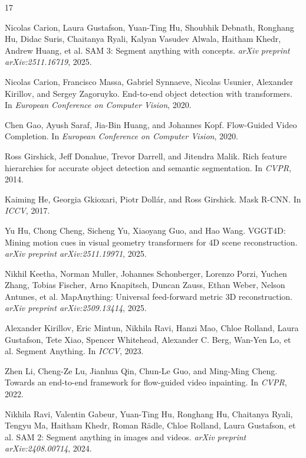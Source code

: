 \documentclass[10pt,twocolumn,letterpaper]{article}
\begin{document}
\begin{thebibliography}{17}\small

Nicolas Carion, Laura Gustafson, Yuan-Ting Hu, Shoubhik Debnath, Ronghang Hu, Didac Suris, Chaitanya Ryali, Kalyan Vasudev Alwala, Haitham Khedr, Andrew Huang, et al.
SAM 3: Segment anything with concepts.
\textit{arXiv preprint arXiv:2511.16719}, 2025.

Nicolas Carion, Francisco Massa, Gabriel Synnaeve, Nicolas Usunier, Alexander Kirillov, and Sergey Zagoruyko.
End-to-end object detection with transformers.
In \textit{European Conference on Computer Vision}, 2020.

Chen Gao, Ayush Saraf, Jia-Bin Huang, and Johannes Kopf.
Flow-Guided Video Completion.
In \textit{European Conference on Computer Vision}, 2020.

Ross Girshick, Jeff Donahue, Trevor Darrell, and Jitendra Malik.
Rich feature hierarchies for accurate object detection and semantic segmentation.
In \textit{CVPR}, 2014.

Kaiming He, Georgia Gkioxari, Piotr Doll{\'a}r, and Ross Girshick.
Mask R-CNN.
In \textit{ICCV}, 2017.

Yu Hu, Chong Cheng, Sicheng Yu, Xiaoyang Guo, and Hao Wang.
VGGT4D: Mining motion cues in visual geometry transformers for 4D scene reconstruction.
\textit{arXiv preprint arXiv:2511.19971}, 2025.

Nikhil Keetha, Norman Muller, Johannes Schonberger, Lorenzo Porzi, Yuchen Zhang, Tobias Fischer, Arno Knapitsch, Duncan Zauss, Ethan Weber, Nelson Antunes, et al.
MapAnything: Universal feed-forward metric 3D reconstruction.
\textit{arXiv preprint arXiv:2509.13414}, 2025.

Alexander Kirillov, Eric Mintun, Nikhila Ravi, Hanzi Mao, Chloe Rolland, Laura Gustafson, Tete Xiao, Spencer Whitehead, Alexander C. Berg, Wan-Yen Lo, et al.
Segment Anything.
In \textit{ICCV}, 2023.

Zhen Li, Cheng-Ze Lu, Jianhua Qin, Chun-Le Guo, and Ming-Ming Cheng.
Towards an end-to-end framework for flow-guided video inpainting.
In \textit{CVPR}, 2022.

Nikhila Ravi, Valentin Gabeur, Yuan-Ting Hu, Ronghang Hu, Chaitanya Ryali, Tengyu Ma, Haitham Khedr, Roman R\"adle, Chloe Rolland, Laura Gustafson, et al.
SAM 2: Segment anything in images and videos.
\textit{arXiv preprint arXiv:2408.00714}, 2024.


\end{thebibliography}
\end{document}
